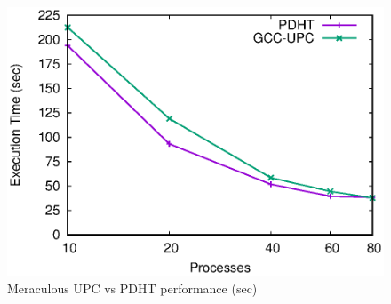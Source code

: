 \begin{figure}
  \centering
  \includegraphics[width=.9\linewidth]{plots/meraculous}
  \caption{Meraculous UPC vs PDHT performance (sec)}
  \label{fig:meraculous}
\end{figure}


